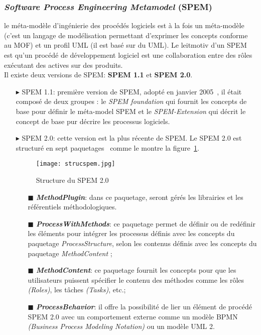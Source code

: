 \begin{itemize}
\subsubsection*{\textit{Software Process Engineering Metamodel} (SPEM)}
le méta-modèle d'ingénierie des procédés logiciels est à la fois un méta-modèle (c'est un langage de modélisation permettant d'exprimer les concepts conforme au MOF) et un profil UML (il est basé sur du UML). Le leitmotiv d'un SPEM est qu'un procédé de développement logiciel est une collaboration entre des rôles exécutant des actives sur des produits. \\
Il existe deux versions de SPEM: \textbf{SPEM 1.1} et \textbf{SPEM 2.0}.
\begin{itemize}
\item[\tiny{$\blacktriangleright$}] SPEM 1.1: première version de SPEM, adopté en janvier 2005~\cite{omg1}, il était composé de deux groupes : le \textit{SPEM foundation} qui fournit les concepts de base pour définir le méta-model SPEM et le \textit{SPEM-Extension} qui décrit le concept de base pur décrire les processus logiciels. 
\item[\tiny{$\blacktriangleright$}] SPEM 2.0: cette version est la plus récente de SPEM. Le SPEM 2.0 est structuré en sept paquetages~\cite{omg2} comme le montre la figure~\ref{sspem}.
\clearpage
\begin{figure}[h]
\centering
\texttt{[image: strucspem.jpg]}
\caption{\label{sspem}Structure du SPEM 2.0~\cite{omg2}}
\end{figure}
\begin{itemize}
\item[\tiny{$\blacksquare$}] \textbf{ \textit{MethodPlugin}}: dans ce paquetage, seront gérés les librairies et les référentiels méthodologiques.
\item[\tiny{$\blacksquare$}] \textbf{ \textit{ProcessWithMethods}}: ce paquetage permet de définir ou de redéfinir les éléments pour intégrer les processus définis avec les concepts du paquetage \textit{ProcessStructure}, selon les contenus définis avec les concepts du paquetage \textit{MethodContent} ;
\item[\tiny{$\blacksquare$}] \textbf{ \textit{MethodContent}}: ce paquetage fournit les concepts pour que les utilisateurs puissent spécifier le contenu des méthodes comme les rôles \textit{(Roles)}, les tâches \textit{(Tasks)}, etc.; 
\item[\tiny{$\blacksquare$}] \textbf{ \textit{ProcessBehavior}}: il offre la possibilité de lier un élément de procédé SPEM 2.0 avec un comportement externe comme un modèle BPMN \textit{(Business Process Modeling Notation)} ou un modèle UML 2.

\end{itemize}
\end{itemize}
\end{itemize}
